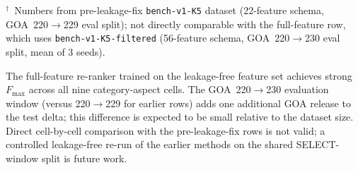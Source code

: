 \begin{table}[htbp]
  \centering
  \caption[Fmax: complete comparison of all methods]{$F_{\max}$: complete comparison of all methods.}
  \label{tab:results-all}
\end{table}

\noindent$^\dagger$~Numbers from pre-leakage-fix \texttt{bench-v1-K5} dataset
(22-feature schema, GOA~220$\to$229 eval split); not directly comparable with
the full-feature row, which uses \texttt{bench-v1-K5-filtered}
(56-feature schema, GOA~220$\to$230 eval split, mean of 3 seeds).

The full-feature re-ranker trained on the leakage-free feature set achieves strong
$F_{\max}$ across all nine category-aspect cells. The GOA~220$\to$230
evaluation window (versus 220$\to$229 for earlier rows) adds one additional
GOA release to the test delta; this difference is expected to be small relative
to the dataset size. Direct cell-by-cell comparison with the pre-leakage-fix
rows is not valid; a controlled leakage-free re-run of the earlier methods on
the shared SELECT-window split is future work.

